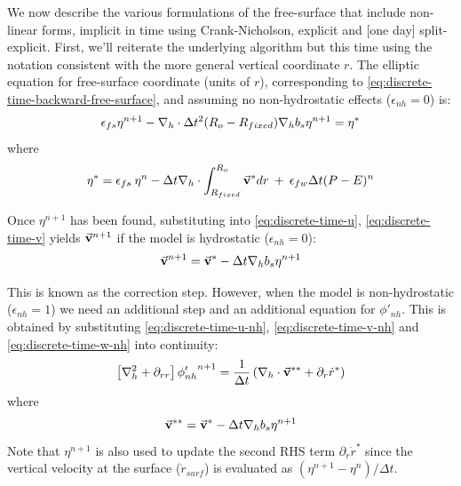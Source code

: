 We now describe the various formulations of the free-surface that
include non-linear forms, implicit in time using Crank-Nicholson,
explicit and [one day] split-explicit. First, we'll reiterate the
underlying algorithm but this time using the notation consistent with
the more general vertical coordinate $r$. The elliptic equation for
free-surface coordinate (units of $r$), corresponding to
\ref{eq:discrete-time-backward-free-surface}, and
assuming no non-hydrostatic effects ($\epsilon_{nh} = 0$) is:
\begin{eqnarray}
\epsilon_{fs} {\eta}^{n+1} -
{\bf \nabla}_h \cdot \Delta t^2 (R_o-R_{fixed}) {\bf \nabla}_h b_s
{\eta}^{n+1} = {\eta}^*
\label{eq-solve2D}
\end{eqnarray}
where
\begin{eqnarray}
{\eta}^* = \epsilon_{fs} \: {\eta}^{n} -
\Delta t {\bf \nabla}_h \cdot \int_{R_{fixed}}^{R_o} \vec{\bf v}^* dr
\: + \: \epsilon_{fw} \Delta t (P-E)^{n} 
\label{eq-solve2D_rhs}
\end{eqnarray}



Once ${\eta}^{n+1}$ has been found, substituting into
\ref{eq:discrete-time-u}, \ref{eq:discrete-time-v} yields $\vec{\bf v}^{n+1}$ 
if the model is hydrostatic ($\epsilon_{nh}=0$):
$$
\vec{\bf v}^{n+1} = \vec{\bf v}^{*}
- \Delta t {\bf \nabla}_h b_s {\eta}^{n+1}
$$

This is known as the correction step. However, when the model is
non-hydrostatic ($\epsilon_{nh}=1$) we need an additional step and an
additional equation for $\phi'_{nh}$. This is obtained by substituting
\ref{eq:discrete-time-u-nh}, \ref{eq:discrete-time-v-nh} and \ref{eq:discrete-time-w-nh}
into continuity:
\begin{equation}
\left[ {\bf \nabla}_h^2 + \partial_{rr} \right] {\phi'_{nh}}^{n+1}
= \frac{1}{\Delta t} \left(
{\bf \nabla}_h \cdot \vec{\bf v}^{**} + \partial_r \dot{r}^* \right)
\end{equation}
where
\begin{displaymath}
\vec{\bf v}^{**} = \vec{\bf v}^* - \Delta t {\bf \nabla}_h b_s {\eta}^{n+1}
\end{displaymath}
Note that $\eta^{n+1}$ is also used to update the second RHS term
$\partial_r \dot{r}^* $ since
the vertical velocity at the surface ($\dot{r}_{surf}$) 
is evaluated as $(\eta^{n+1} - \eta^n) / \Delta t$.

